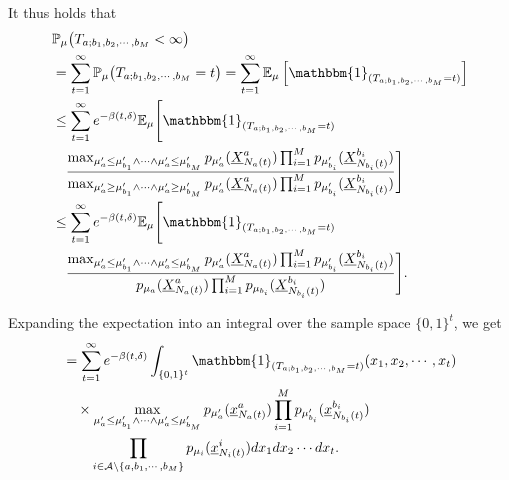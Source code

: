 \documentclass[final]{IEEEtran}
\newcommand{\nn}{\nonumber}
\begin{document}
It thus holds that
\begin{align}
&\mathbb{P}_{\mu}\big(T_{a;b_1,b_2,\cdots,b_M} < \infty\big) \nonumber \\
&= \sum_{t=1}^{\infty} \mathbb{P}_{\mu}\big(T_{a;b_1,b_2,\cdots,b_M} = t\big) = \sum_{t=1}^{\infty} \mathbb{E}_{\mu}\left[\mathbbm{1}_{(T_{a;b_1,b_2,\cdots,b_M} = t)}\right] \\
&\leq \sum_{t=1}^{\infty} e^{-\beta(t,\delta)} \mathbb{E}_{\mu}\Bigg[ \mathbbm{1}_{(T_{a;b_1,b_2,\cdots,b_M} = t)}\nn\\
&\quad  \frac{
\max_{\mu'_a \leq \mu'_{b_1} \wedge \cdots \wedge \mu'_a \leq \mu'_{b_M}} p_{\mu'_a}(\underline{X}_{N_a(t)}^a) \prod_{i=1}^M p_{\mu'_{b_i}}(\underline{X}_{N_{b_i}(t)}^{b_i})
}{
\max_{\mu'_a \geq \mu'_{b_1} \wedge \cdots \wedge \mu'_a \geq \mu'_{b_M}} p_{\mu'_a}(\underline{X}_{N_a(t)}^a) \prod_{i=1}^M p_{\mu'_{b_i}}(\underline{X}_{N_{b_i}(t)}^{b_i})
}\Bigg] \\
&\leq \sum_{t=1}^{\infty} e^{-\beta(t,\delta)} \mathbb{E}_{\mu}\Bigg[ \mathbbm{1}_{(T_{a;b_1,b_2,\cdots,b_M} = t)}\nn\\
&\quad  \frac{
\max_{\mu'_a \leq \mu'_{b_1} \wedge \cdots \wedge \mu'_a \leq \mu'_{b_M}} p_{\mu'_a}(\underline{X}_{N_a(t)}^a) \prod_{i=1}^M p_{\mu'_{b_i}}(\underline{X}_{N_{b_i}(t)}^{b_i})
}{
p_{\mu_a}(\underline{X}_{N_a(t)}^a) \prod_{i=1}^M p_{\mu_{b_i}}(\underline{X}_{N_{b_i}(t)}^{b_i})
}\Bigg].
\end{align}

Expanding the expectation into an integral over the sample space \(\{0,1\}^t\), we get
\begin{align}
&= \sum_{t=1}^{\infty} e^{-\beta(t,\delta)} \int_{\{0,1\}^t} \mathbbm{1}_{(T_{a;b_1,b_2,\cdots,b_M} = t)}(x_1,x_2,\cdots,x_t) \nonumber \\
&\quad \times
\max_{\mu'_a \leq \mu'_{b_1} \wedge \cdots \wedge \mu'_a \leq \mu'_{b_M}} p_{\mu'_a}(\underline{x}_{N_a(t)}^a) \prod_{i=1}^M p_{\mu'_{b_i}}(\underline{x}_{N_{b_i}(t)}^{b_i})\nn\\
&\qquad  \prod_{i \in \mathcal{A} \setminus \{a,b_1,\cdots,b_M\}} p_{\mu_i}(\underline{x}_{N_i(t)}^i)
dx_1 dx_2 \cdots dx_t.
\end{align}
\end{document}
